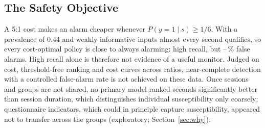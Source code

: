 \subsection{The Safety Objective}
A 5:1 cost makes an alarm cheaper whenever $P(y=1\mid s)\ge1/6$. With a prevalence of 0.44 and weakly informative inputs almost every second qualifies, so every cost-optimal policy is close to always alarming: high recall, but \DOneFPRMin--\DOneFPRMax\,\% false alarms. High recall alone is therefore not evidence of a useful monitor. Judged on cost, threshold-free ranking and cost curves across ratios, near-complete detection with a controlled false-alarm rate is not achieved on these data. Once sessions and groups are not shared, no primary model ranked seconds significantly better than session duration, which distinguishes individual susceptibility only coarsely; questionnaire indicators, which could in principle capture susceptibility, appeared not to transfer across the \nGroupsEval{} groups (exploratory; Section~\ref{sec:why}).

